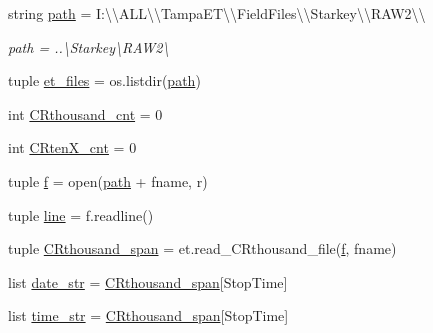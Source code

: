 \begin{DoxyCompactItemize}
\item 
string \hyperlink{namespace_date___ranges___concat__mod_a22267529906f1108c44c7fe2c252d206}{path} = \textquotesingle{}I\+:\textbackslash{}\textbackslash{}\+A\+L\+L\textbackslash{}\textbackslash{}\+Tampa\+E\+T\textbackslash{}\textbackslash{}\+Field\+Files\textbackslash{}\textbackslash{}\+Starkey\textbackslash{}\textbackslash{}\+R\+A\+W2\textbackslash{}\textbackslash{}\textquotesingle{}
\begin{DoxyCompactList}\small\item\em path = \textquotesingle{}..\textbackslash{}Starkey\textbackslash{}R\+A\+W2\textbackslash{}\textquotesingle{} \end{DoxyCompactList}\item 
tuple \hyperlink{namespace_date___ranges___concat__mod_a5df2cb82df527210abe5d9839e6742d3}{et\+\_\+files} = os.\+listdir(\hyperlink{namespace_date___ranges___concat__mod_a22267529906f1108c44c7fe2c252d206}{path})
\item 
int \hyperlink{namespace_date___ranges___concat__mod_a890e4737c0bb643c628cfc0ace517188}{C\+Rthousand\+\_\+cnt} = 0
\item 
int \hyperlink{namespace_date___ranges___concat__mod_a6bd3cf3e30e0bbbc11bdfec9a070ef84}{C\+Rten\+X\+\_\+cnt} = 0
\item 
tuple \hyperlink{namespace_date___ranges___concat__mod_a703db4502ab158179b3d9fe9cef2192f}{f} = open(\hyperlink{namespace_date___ranges___concat__mod_a22267529906f1108c44c7fe2c252d206}{path} + fname, \textquotesingle{}r\textquotesingle{})
\item 
tuple \hyperlink{namespace_date___ranges___concat__mod_ad67afc9f4f032da228efc9052cc5a63d}{line} = f.\+readline()
\item 
tuple \hyperlink{namespace_date___ranges___concat__mod_a222cab6f1387a2cfc5fda108d2d28b4c}{C\+Rthousand\+\_\+span} = et.\+read\+\_\+\+C\+Rthousand\+\_\+file(\hyperlink{namespace_date___ranges___concat__mod_a703db4502ab158179b3d9fe9cef2192f}{f}, fname)
\item 
list \hyperlink{namespace_date___ranges___concat__mod_a6a56c00d72f298edbcea63a9dc67ce73}{date\+\_\+str} = \hyperlink{namespace_date___ranges___concat__mod_a222cab6f1387a2cfc5fda108d2d28b4c}{C\+Rthousand\+\_\+span}\mbox{[}\textquotesingle{}Stop\+Time\textquotesingle{}\mbox{]}
\item 
list \hyperlink{namespace_date___ranges___concat__mod_a93f60dd68eac5db76147864422f08aaa}{time\+\_\+str} = \hyperlink{namespace_date___ranges___concat__mod_a222cab6f1387a2cfc5fda108d2d28b4c}{C\+Rthousand\+\_\+span}\mbox{[}\textquotesingle{}Stop\+Time\textquotesingle{}\mbox{]}

\end{DoxyCompactItemize}
